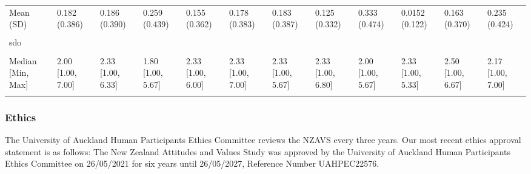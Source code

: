 \documentclass[
  single column]{article}
\begin{document}
\begin{landscape}
\begin{longtable}[t]{llllllllllll}
\addlinespace
Mean (SD) & 0.182 (0.386) & 0.186 (0.390) & 0.259 (0.439) & 0.155 (0.362) & 0.178 (0.383) & 0.183 (0.387) & 0.125 (0.332) & 0.333 (0.474) & 0.0152 (0.122) & 0.163 (0.370) & 0.235 (0.424)\\
\cellcolor{gray!10}{Median [Min, Max]} & \cellcolor{gray!10}{0 [0, 1.00]} & \cellcolor{gray!10}{0 [0, 1.00]} & \cellcolor{gray!10}{0 [0, 1.00]} & \cellcolor{gray!10}{0 [0, 1.00]} & \cellcolor{gray!10}{0 [0, 1.00]} & \cellcolor{gray!10}{0 [0, 1.00]} & \cellcolor{gray!10}{0 [0, 1.00]} & \cellcolor{gray!10}{0 [0, 1.00]} & \cellcolor{gray!10}{0 [0, 1.00]} & \cellcolor{gray!10}{0 [0, 1.00]} & \cellcolor{gray!10}{0 [0, 1.00]}\\
sdo &  &  &  &  &  &  &  &  &  &  & \\
\cellcolor{gray!10}{Mean (SD)} & \cellcolor{gray!10}{2.16 (0.963)} & \cellcolor{gray!10}{2.47 (0.986)} & \cellcolor{gray!10}{1.99 (0.960)} & \cellcolor{gray!10}{2.38 (0.969)} & \cellcolor{gray!10}{2.37 (0.966)} & \cellcolor{gray!10}{2.41 (0.943)} & \cellcolor{gray!10}{2.45 (1.03)} & \cellcolor{gray!10}{2.30 (1.15)} & \cellcolor{gray!10}{2.44 (0.896)} & \cellcolor{gray!10}{2.52 (0.987)} & \cellcolor{gray!10}{2.26 (1.02)}\\
Median [Min, Max] & 2.00 [1.00, 7.00] & 2.33 [1.00, 6.33] & 1.80 [1.00, 5.67] & 2.33 [1.00, 6.00] & 2.33 [1.00, 7.00] & 2.33 [1.00, 5.67] & 2.33 [1.00, 6.80] & 2.00 [1.00, 5.67] & 2.33 [1.00, 5.33] & 2.50 [1.00, 6.67] & 2.17 [1.00, 7.00]\\
\addlinespace
\cellcolor{gray!10}{Missing} & \cellcolor{gray!10}{1 (0.0\%)} & \cellcolor{gray!10}{2 (0.1\%)} & \cellcolor{gray!10}{0 (0\%)} & \cellcolor{gray!10}{2 (0.1\%)} & \cellcolor{gray!10}{6 (0.2\%)} & \cellcolor{gray!10}{1 (0.1\%)} & \cellcolor{gray!10}{1 (0.7\%)} & \cellcolor{gray!10}{0 (0\%)} & \cellcolor{gray!10}{0 (0\%)} & \cellcolor{gray!10}{1 (0.2\%)} & \cellcolor{gray!10}{1 (0.1\%)}\\*

\end{longtable}

\endgroup{}


\end{landscape}

\newpage{}

\subsubsection{Ethics}\label{ethics}

The University of Auckland Human Participants Ethics Committee reviews
the NZAVS every three years. Our most recent ethics approval statement
is as follows: The New Zealand Attitudes and Values Study was approved
by the University of Auckland Human Participants Ethics Committee on
26/05/2021 for six years until 26/05/2027, Reference Number UAHPEC22576.
\end{document}
